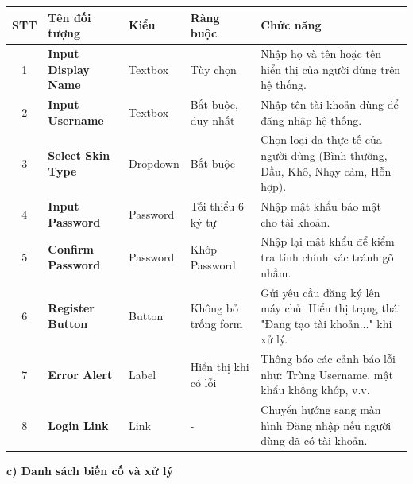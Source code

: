 \documentclass[12pt,a4paper]{article}
\begin{document}
\begin{center}
\renewcommand{\arraystretch}{1.5}
\begin{tabularx}{\textwidth}{|c|l|l|l|X|}
\hline
\rowcolor{blue!20}
\textbf{STT} & \textbf{Tên đối tượng} & \textbf{Kiểu} & \textbf{Ràng buộc} & \textbf{Chức năng} \\ \hline

1 & \textbf{Input Display Name} & Textbox & Tùy chọn & Nhập họ và tên hoặc tên hiển thị của người dùng trên hệ thống. \\ \hline

2 & \textbf{Input Username} & Textbox & Bắt buộc, duy nhất & Nhập tên tài khoản dùng để đăng nhập hệ thống. \\ \hline

3 & \textbf{Select Skin Type} & Dropdown & Bắt buộc & Chọn loại da thực tế của người dùng (Bình thường, Dầu, Khô, Nhạy cảm, Hỗn hợp). \\ \hline

4 & \textbf{Input Password} & Password & Tối thiểu 6 ký tự & Nhập mật khẩu bảo mật cho tài khoản. \\ \hline

5 & \textbf{Confirm Password} & Password & Khớp Password & Nhập lại mật khẩu để kiểm tra tính chính xác tránh gõ nhầm. \\ \hline

6 & \textbf{Register Button} & Button & Không bỏ trống form & Gửi yêu cầu đăng ký lên máy chủ. Hiển thị trạng thái "Đang tạo tài khoản..." khi xử lý. \\ \hline

7 & \textbf{Error Alert} & Label & Hiển thị khi có lỗi & Thông báo các cảnh báo lỗi như: Trùng Username, mật khẩu không khớp, v.v. \\ \hline

8 & \textbf{Login Link} & Link & - & Chuyển hướng sang màn hình Đăng nhập nếu người dùng đã có tài khoản. \\ \hline

\end{tabularx}
\end{center}

\textbf{c) Danh sách biến cố và xử lý}
\end{document}
